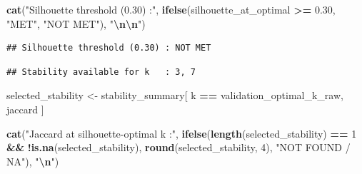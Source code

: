 \documentclass[
]{article}
\newenvironment{Shaded}{\begin{snugshade}}{\end{snugshade}}
\newcommand{\AttributeTok}[1]{\textcolor[rgb]{0.13,0.29,0.53}{#1}}
\newcommand{\DecValTok}[1]{\textcolor[rgb]{0.00,0.00,0.81}{#1}}
\newcommand{\FloatTok}[1]{\textcolor[rgb]{0.00,0.00,0.81}{#1}}
\newcommand{\FunctionTok}[1]{\textcolor[rgb]{0.13,0.29,0.53}{\textbf{#1}}}
\newcommand{\NormalTok}[1]{#1}
\newcommand{\OtherTok}[1]{\textcolor[rgb]{0.56,0.35,0.01}{#1}}
\newcommand{\SpecialCharTok}[1]{\textcolor[rgb]{0.81,0.36,0.00}{\textbf{#1}}}
\newcommand{\StringTok}[1]{\textcolor[rgb]{0.31,0.60,0.02}{#1}}
\begin{document}
\begin{Shaded}
\begin{Highlighting}[]
\FunctionTok{cat}\NormalTok{(}\StringTok{"Silhouette threshold (0.30) :"}\NormalTok{,}
    \FunctionTok{ifelse}\NormalTok{(silhouette\_at\_optimal }\SpecialCharTok{\textgreater{}=} \FloatTok{0.30}\NormalTok{, }\StringTok{"MET"}\NormalTok{, }\StringTok{"NOT MET"}\NormalTok{), }\StringTok{"}\SpecialCharTok{\textbackslash{}n\textbackslash{}n}\StringTok{"}\NormalTok{)}
\end{Highlighting}
\end{Shaded}

\begin{verbatim}
## Silhouette threshold (0.30) : NOT MET
\end{verbatim}

\begin{Shaded}
\end{Shaded}

\begin{verbatim}
## Stability available for k   : 3, 7
\end{verbatim}

\begin{Shaded}
\begin{Highlighting}[]
\NormalTok{selected\_stability }\OtherTok{\textless{}{-}}\NormalTok{ stability\_summary[}
\NormalTok{  k }\SpecialCharTok{==}\NormalTok{ validation\_optimal\_k\_raw, jaccard}
\NormalTok{]}

\FunctionTok{cat}\NormalTok{(}\StringTok{"Jaccard at silhouette{-}optimal k :"}\NormalTok{,}
    \FunctionTok{ifelse}\NormalTok{(}\FunctionTok{length}\NormalTok{(selected\_stability) }\SpecialCharTok{==} \DecValTok{1} \SpecialCharTok{\&\&} \SpecialCharTok{!}\FunctionTok{is.na}\NormalTok{(selected\_stability),}
           \FunctionTok{round}\NormalTok{(selected\_stability, }\DecValTok{4}\NormalTok{), }\StringTok{"NOT FOUND / NA"}\NormalTok{), }\StringTok{"}\SpecialCharTok{\textbackslash{}n}\StringTok{"}\NormalTok{)}
\end{Highlighting}
\end{Shaded}
\end{document}
